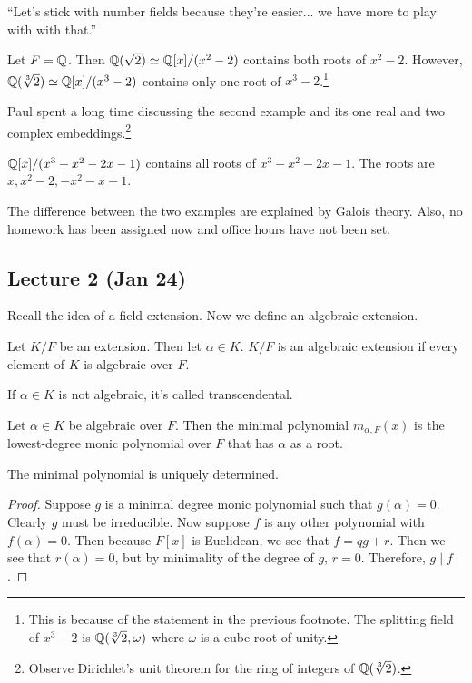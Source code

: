 \message{ !name(notes.tex)}\documentclass[10pt, twoside]{article}
\begin{document}
    ``Let's stick with number fields because they're easier... we have more to play with with that.''

    \begin{exm}
        Let $F = \mathbb{Q}$. Then $\mathbb{Q}(\sqrt{2}) \simeq \mathbb{Q}[x]/(x^2-2)$ contains both roots of $x^2-2$. However, $\mathbb{Q}(\sqrt[3]{2}) \simeq \mathbb{Q}[x]/(x^3-2)$ contains only one root of $x^3-2$.\footnote{This is because of the statement in the previous footnote. The splitting field of $x^3-2$ is $\mathbb{Q}(\sqrt[3]{2}, \omega)$ where $\omega$ is a cube root of unity.}
    \end{exm}

    Paul spent a long time discussing the second example and its one real and two complex embeddings.\footnote{Observe Dirichlet's unit theorem for the ring of integers of $\mathbb{Q}(\sqrt[3]{2})$.}

    \begin{exm}
        $\mathbb{Q}[x]/(x^3+x^2-2x-1)$ contains all roots of $x^3+x^2-2x-1$. The roots are $x, x^2-2, -x^2-x+1$.
    \end{exm}

    The difference between the two examples are explained by Galois theory. Also, no homework has been assigned now and office hours have not been set.

    \subsection{Lecture 2 (Jan 24)}%
    Recall the idea of a field extension. Now we define an algebraic extension.

    \begin{defn}
        Let $K/F$ be an extension. Then let $\alpha \in K$. $K/F$ is an algebraic extension if every element of $K$ is algebraic over $F$.
    \end{defn}

    If $\alpha \in K$ is not algebraic, it's called transcendental.

    \begin{defn}
        Let $\alpha \in K$ be algebraic over $F$. Then the minimal polynomial $m_{\alpha,F}(x)$ is the lowest-degree monic polynomial over $F$ that has $\alpha$ as a root.
    \end{defn}

    \begin{prop}
        The minimal polynomial is uniquely determined.
        \begin{proof}
            Suppose $g$ is a minimal degree monic polynomial such that $g(\alpha) = 0$. Clearly $g$ must be irreducible. Now suppose $f$ is any other polynomial with $f(\alpha) = 0$. Then because $F[x]$ is Euclidean, we see that $f = qg+r$. Then we see that $r(\alpha) = 0$, but by minimality of the degree of $g$, $r=0$. Therefore, $g \mid f$.
        \end{proof}
    \end{prop}
\end{document}
